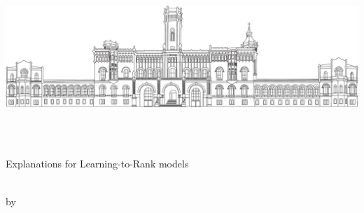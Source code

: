 \begin{titlepage}
	\begin{addmargin}[-1cm]{-3cm}
	\vspace{1cm}
    \begin{center}
    	\includegraphics[width=13.8cm]{gfx/welfenschloss}
        \large  

        \hfill

        \begingroup
            \huge{}\LARGE{}
            \huge{}\LARGE{}
            \huge{}\LARGE{} \\
        \endgroup
		\smallskip
        \normalsize
        \myFaculty \\
        \myDepartment

        \vfill
        
        \LARGE {\color{LUHblue}\spacedallcaps Explanations for Learning-to-Rank models} \\
        \vfill
        \Large \myDegree \\
        \vfill
        
        \large by \\ %
        \smallskip
        \large {} \\
        \smallskip
        \large \myTime \\ %
        

\end{center}
\end{addmargin}
\end{titlepage}
